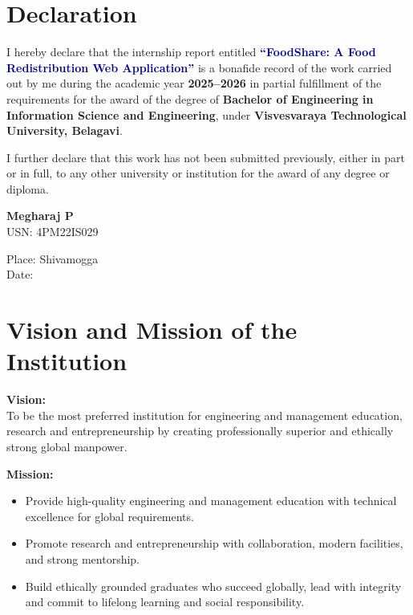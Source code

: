 \documentclass[12pt,a4paper]{report}
\newcommand{\studentname}{Megharaj P}
\newcommand{\usn}{4PM22IS029}
\newcommand{\branch}{Information Science and Engineering}
\newcommand{\academicyear}{2025--2026}
\newcommand{\projecttitle}{FoodShare}
\begin{document}
\clearpage
\chapter*{Declaration}

I hereby declare that the internship report entitled \textbf{\textcolor{darkblue}{``\projecttitle: A Food Redistribution Web Application''}} is a bonafide record of the work carried out by me during the academic year \textbf{\academicyear} in partial fulfillment of the requirements for the award of the degree of \textbf{Bachelor of Engineering in \branch}, under \textbf{Visvesvaraya Technological University, Belagavi}.

I further declare that this work has not been submitted previously, either in part or in full, to any other university or institution for the award of any degree or diploma.

\vspace{1.5cm}
\begin{flushright}
\textbf{\studentname}\\
USN: \usn
\end{flushright}

\vspace{1.5cm}
Place: Shivamogga\\
Date:

\clearpage
\chapter*{Vision and Mission of the Institution}

\textbf{Vision:}\\
To be the most preferred institution for engineering and management education, research and entrepreneurship by creating professionally superior and ethically strong global manpower.

\vspace{0.5cm}
\textbf{Mission:}
\begin{itemize}[leftmargin=1.2cm]
\item Provide high-quality engineering and management education with technical excellence for global requirements.
\item Promote research and entrepreneurship with collaboration, modern facilities, and strong mentorship.
\item Build ethically grounded graduates who succeed globally, lead with integrity and commit to lifelong learning and social responsibility.
\end{itemize}
\end{document}
